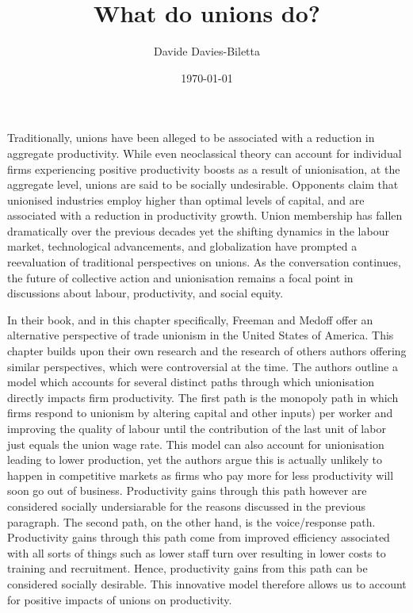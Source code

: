 \documentclass[10pt]{article}
\title{What do unions do?}
\author{Davide Davies-Biletta}
\date{\today}
\newcommand{\bb}{\bigbreak\noindent}
\begin{document}
	\maketitle
	\setcounter{page}{1}
	\begin{spacing}{1.5}
	
	\bb
	Traditionally, unions have been alleged to be associated with a reduction in aggregate productivity. While even neoclassical theory can account for individual firms experiencing positive productivity boosts as a result of unionisation, at the aggregate level, unions are said to be socially undesirable. Opponents claim that unionised industries employ higher than optimal levels of capital, and are associated with a reduction in productivity growth. Union membership has fallen dramatically over the previous decades yet the shifting dynamics in the labour market, technological advancements, and globalization have prompted a reevaluation of traditional perspectives on unions. As the conversation continues, the future of collective action and unionisation remains a focal point in discussions about labour, productivity, and social equity.
	
	\bb
	In their book, and in this chapter specifically, Freeman and Medoff offer an alternative perspective of trade unionism in the United States of America. This chapter builds upon their own research and the research of others authors offering similar perspectives, which were controversial at the time. The authors outline a model which accounts for several distinct paths through which unionisation directly impacts firm productivity. The first path is the monopoly path in which firms respond to unionism by altering capital and other inputs) per worker and improving the quality of labour until the contribution of the last unit of labor just equals the union wage rate. This model can also account for unionisation leading to lower production, yet the authors argue this is actually unlikely to happen in competitive markets as firms who pay more for less productivity will soon go out of business. Productivity gains through this path however are considered socially undersiarable for the reasons discussed in the previous paragraph. 
	The second path, on the other hand, is the voice/response path. Productivity gains through this path come from improved efficiency associated with all sorts of things such as lower staff turn over resulting in lower costs to training and recruitment. Hence, productivity gains from this path can be considered socially desirable. This innovative model therefore allows us to account for positive impacts of unions on productivity.
	 

\end{spacing}
\end{document}
